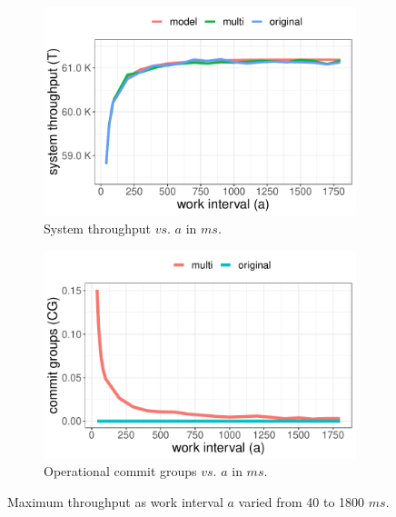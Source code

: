 \begin{figure}[htbp]
\centering
\begin{minipage}{.63\textwidth}
\begin{subfigure}{0.5\textwidth}
    \includegraphics[width=\linewidth]{figures/fig-4a.pdf}
    \caption{System throughput $vs.$ $a$ in $ms$.} \label{fig:4a}
  \end{subfigure}%
  \hspace*{\fill}   %
\begin{subfigure}{0.5\textwidth}
    \includegraphics[width=\linewidth]{figures/fig-4b.pdf}
    \caption{Operational commit groups $vs.$ $a$ in $ms$.} \label{fig:4b}
  \end{subfigure}
\caption{Maximum throughput as work interval $a$ varied from 40 to 1800 $ms$.} \label{fig:4}
\end{minipage}\hfill

\end{figure}
